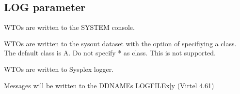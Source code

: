 \documentclass[letterpaper,10pt,english]{sphinxmanual}
\begin{document}
\ignorespaces 

\subsection{LOG parameter}
\label{\detokenize{Installation_Guide:log-parameter}}\label{\detokenize{Installation_Guide:index-87}}
\begin{sphinxVerbatim}[commandchars=\\\{\}]
                    
\end{sphinxVerbatim}
\begin{description}
\sphinxAtStartPar
WTOs are written to the SYSTEM console.

\sphinxAtStartPar
WTOs are written to the sysout dataset with the option of specifiying a class. The default class is A. Do not specify * as class. This is not supported.

\sphinxAtStartPar
WTOs are written to Sysplex logger.

\sphinxAtStartPar
Messages will be written to the DDNAMEs LOGFILEx|y               (Virtel 4.61)

\end{description}

\ignorespaces 
\end{document}
